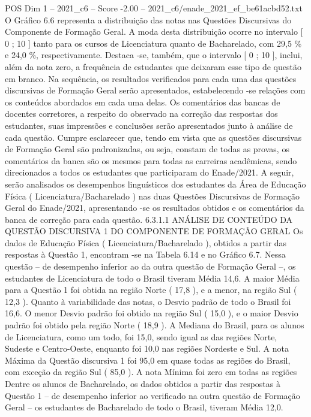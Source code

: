 \begin{textsample}{POS Dim 1 – 2021\_c6 – Score -2.00 – 2021\_c6/enade\_2021\_ef\_be61acbd52.txt}
O Gráfico 6.6 representa a distribuição das notas nas Questões Discursivas do Componente de Formação Geral.
A moda desta distribuição ocorre no intervalo [ 0 ; 10 ] tanto para os cursos de Licenciatura quanto de Bacharelado, com 29,5 \% e 24,0 \%, respectivamente.
Destaca -se, também, que o intervalo [ 0 ; 10 ], inclui, além da nota zero, a frequência de estudantes que deixaram esse tipo de questão em branco.
Na sequência, os resultados verificados para cada uma das questões discursivas de Formação Geral serão apresentados, estabelecendo -se relações com os conteúdos abordados em cada uma delas.
Os comentários das bancas de docentes corretores, a respeito do observado na correção das respostas dos estudantes, suas impressões e conclusões serão apresentados junto à análise de cada questão.
Cumpre esclarecer que, tendo em vista que as questões discursivas de Formação Geral são padronizadas, ou seja, constam de todas as provas, os comentários da banca são os mesmos para todas as carreiras acadêmicas, sendo direcionados a todos os estudantes que participaram do Enade/2021.
A seguir, serão analisados os desempenhos linguísticos dos estudantes da Área de Educação Física ( Licenciatura/Bacharelado ) nas duas Questões Discursivas de Formação Geral do Enade/2021, apresentando -se os resultados obtidos e os comentários da banca de correção para cada questão. 6.3.1.1 ANÁLISE DE CONTEÚDO DA QUESTÃO DISCURSIVA 1 DO COMPONENTE DE FORMAÇÃO GERAL Os dados de Educação Física ( Licenciatura/Bacharelado ), obtidos a partir das respostas à Questão 1, encontram -se na Tabela 6.14 e no Gráfico 6.7.
Nessa questão – de desempenho inferior ao da outra questão de Formação Geral –, os estudantes de Licenciatura de todo o Brasil tiveram Média 14,6.
A maior Média para a Questão 1 foi obtida na região Norte ( 17,8 ), e a menor, na região Sul ( 12,3 ).
Quanto à variabilidade das notas, o Desvio padrão de todo o Brasil foi 16,6.
O menor Desvio padrão foi obtido na região Sul ( 15,0 ), e o maior Desvio padrão foi obtido pela região Norte ( 18,9 ).
A Mediana do Brasil, para os alunos de Licenciatura, como um todo, foi 15,0, sendo igual as das regiões Norte, Sudeste e Centro-Oeste, enquanto foi 10,0 nas regiões Nordeste e Sul.
A nota Máxima da Questão discursiva 1 foi 95,0 em quase todas as regiões do Brasil, com exceção da região Sul ( 85,0 ).
A nota Mínima foi zero em todas as regiões Dentre os alunos de Bacharelado, os dados obtidos a partir das respostas à Questão 1 – de desempenho inferior ao verificado na outra questão de Formação Geral – os estudantes de Bacharelado de todo o Brasil, tiveram Média 12,0.

\end{textsample}

